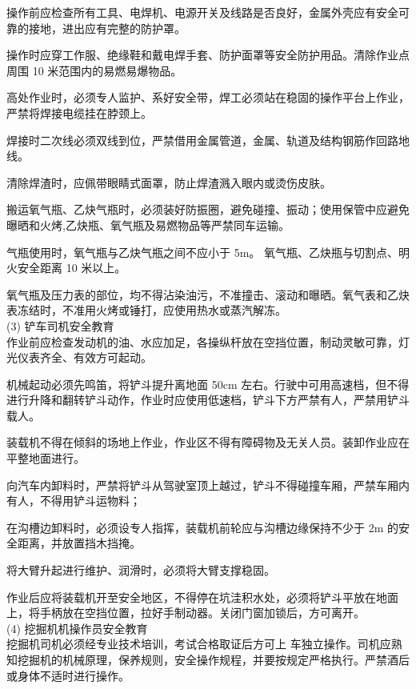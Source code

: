  操作前应检查所有工具、电焊机、电源开关及线路是否良好，金属外壳应有安全可靠的接地，进出应有完整的防护罩。

 操作时应穿工作服、绝缘鞋和戴电焊手套、防护面罩等安全防护用品。清除作业点周围 10 米范围内的易燃易爆物品。

 高处作业时，必须专人监护、系好安全带，焊工必须站在稳固的操作平台上作业，严禁将焊接电缆挂在脖颈上。

 焊接时二次线必须双线到位，严禁借用金属管道，金属、轨道及结构钢筋作回路地线。

 清除焊渣时，应佩带眼睛式面罩，防止焊渣溅入眼内或烫伤皮肤。

 搬运氧气瓶、乙炔气瓶时，必须装好防振圈，避免碰撞、振动；使用保管中应避免曝晒和火烤,乙炔瓶、氧气瓶及易燃物品等严禁同车运输。

 气瓶使用时，氧气瓶与乙炔气瓶之间不应小于 5m。 氧气瓶、乙炔瓶与切割点、明火安全距离 10 米以上。

 氧气瓶及压力表的部位，均不得沾染油污，不准撞击、滚动和曝晒。氧气表和乙炔表冻结时，不准用火烤或锤打，应使用热水或蒸汽解冻。 \\

(3) 铲车司机安全教育\\

 作业前应检查发动机的油、水应加足，各操纵杆放在空挡位置，制动灵敏可靠，灯光仪表齐全、有效方可起动。

 机械起动必须先鸣笛，将铲斗提升离地面 50cm 左右。行驶中可用高速档，但不得进行升降和翻转铲斗动作，作业时应使用低速档，铲斗下方严禁有人，严禁用铲斗载人。

 装载机不得在倾斜的场地上作业，作业区不得有障碍物及无关人员。装卸作业应在平整地面进行。

 向汽车内卸料时，严禁将铲斗从驾驶室顶上越过，铲斗不得碰撞车厢，严禁车厢内有人，不得用铲斗运物料；

在沟槽边卸料时，必须设专人指挥，装载机前轮应与沟槽边缘保持不少于 2m 的安全距离，并放置挡木挡掩。

 将大臂升起进行维护、润滑时，必须将大臂支撑稳固。

 作业后应将装载机开至安全地区，不得停在坑洼积水处，必须将铲斗平放在地面上，将手柄放在空挡位置，拉好手制动器。关闭门窗加锁后，方可离开。\\


(4) 挖掘机机操作员安全教育\\

 挖掘机司机必须经专业技术培训，考试合格取证后方可上
车独立操作。司机应熟知挖掘机的机械原理，保养规则，安全操作规程，并要按规定严格执行。严禁酒后或身体不适时进行操作。


